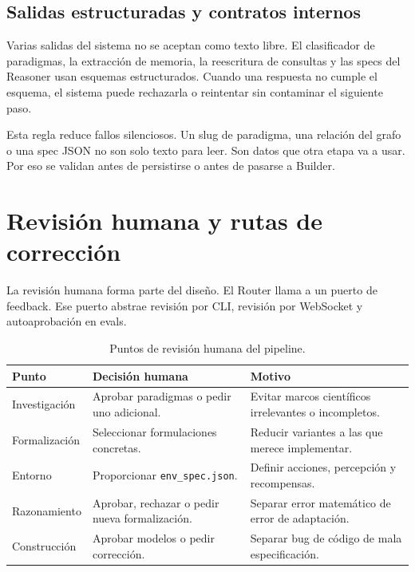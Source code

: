 \subsection{Salidas estructuradas y contratos internos}

Varias salidas del sistema no se aceptan como texto libre. El clasificador de
paradigmas, la extracción de memoria, la reescritura de consultas y las specs
del Reasoner usan esquemas estructurados. Cuando una respuesta no cumple el
esquema, el sistema puede rechazarla o reintentar sin contaminar el siguiente
paso.

Esta regla reduce fallos silenciosos. Un slug de paradigma, una relación del
grafo o una spec JSON no son solo texto para leer. Son datos que otra etapa va a
usar. Por eso se validan antes de persistirse o antes de pasarse a Builder.

\section{Revisión humana y rutas de corrección}
\label{ap:revision-humana}

La revisión humana forma parte del diseño. El Router llama a un puerto de
feedback. Ese puerto abstrae revisión por CLI, revisión por WebSocket y
autoaprobación en evals.

\begin{table}[H]
\begin{center}
\small
\begin{tabular}{|p{3cm}|p{4.8cm}|p{4.8cm}|} \hline
\textbf{Punto} & \textbf{Decisión humana} & \textbf{Motivo} \\ \hline
Investigación & Aprobar paradigmas o pedir uno adicional. & Evitar marcos científicos irrelevantes o incompletos. \\ \hline
Formalización & Seleccionar formulaciones concretas. & Reducir variantes a las que merece implementar. \\ \hline
Entorno & Proporcionar \texttt{env\_spec.json}. & Definir acciones, percepción y recompensas. \\ \hline
Razonamiento & Aprobar, rechazar o pedir nueva formalización. & Separar error matemático de error de adaptación. \\ \hline
Construcción & Aprobar modelos o pedir corrección. & Separar bug de código de mala especificación. \\ \hline
\end{tabular}
\caption{Puntos de revisión humana del pipeline.}
\end{center}
\end{table}

